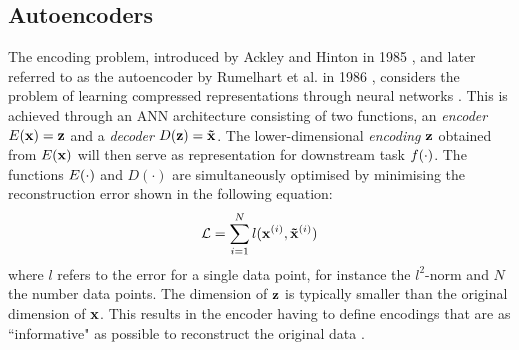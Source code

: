 \subsection{Autoencoders}
The encoding problem, introduced by Ackley and Hinton in 1985 \cite{ackleyLearningAlgorithmBoltzmann1985}, and later referred to as the autoencoder by Rumelhart et al. in 1986 \cite{rumelhartLearningInternalRepresentations1988}, considers the problem of learning compressed representations through neural networks \cite{rumelhartLearningInternalRepresentations1988, bankAutoencoders2021}. This is achieved through an ANN architecture consisting of two functions, an \textit{encoder} $E(\mathbf{x}) = \mathbf{z}$ and a \textit{decoder} $D(\mathbf{z}) = \mathbf{\tilde{x}}$.
The lower-dimensional \textit{encoding} $\mathbf{z}$ obtained from $E(\mathbf{x})$ will then serve as representation for downstream task $f(\cdot)$.
The functions $E(\cdot)$ and $D(\cdot)$ are simultaneously optimised by minimising the reconstruction error shown in the following equation:
\begin{equation}
	\mathcal{L} = \sum_{i = 1}^N l(\mathbf{x}^{(i)}, \mathbf{\tilde{x}}^{(i)})
\end{equation}
where $l$ refers to the error for a single data point, for instance the $l^2$-norm and $N$ the number data points. The dimension of $\mathbf{z}$ is typically smaller than the original dimension of $\mathbf{x}$. This results in the encoder having to define encodings that are as ``informative" as possible to reconstruct the original data \cite{bankAutoencoders2021}.

